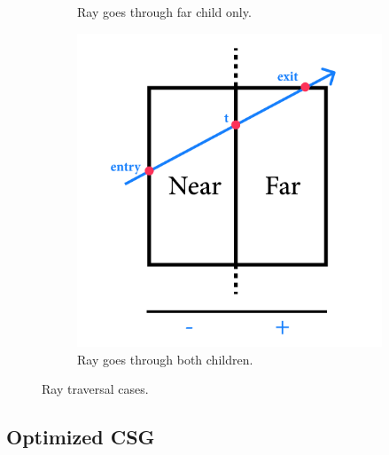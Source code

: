 \documentclass[a4paper,11pt,oneside]{article}
\begin{document}
\begin{figure}[ht]
\begin{subfigure}[b]{0.3\textwidth}
		\caption{Ray goes through far child only.}
		\label{sec4.3:far-child}
	\end{subfigure}
	\hfill
	\begin{subfigure}[b]{0.3\textwidth}
		\centering
		\includegraphics[width=\textwidth]{section4/4.3/middle-intersection.png}
		\caption{Ray goes through both children.}
		\label{sec4.3:both-children}
	\end{subfigure}
	\hfill
	\caption{Ray traversal cases.}
	\label{sec4.3:ray-traversal-cases}
\end{figure}

\subsection{Optimized CSG}
\end{document}
